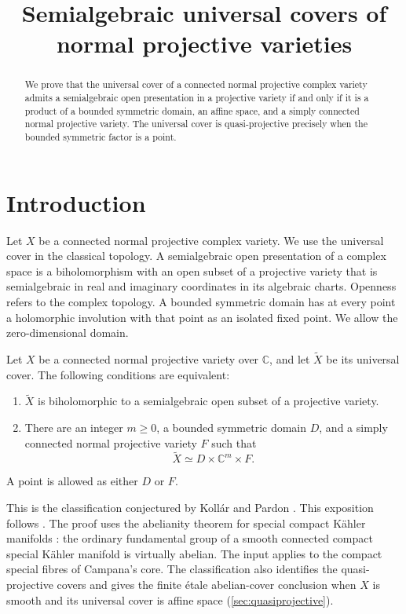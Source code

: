 \documentclass[11pt,a4paper]{amsart}
\title{Semialgebraic universal covers of normal projective varieties}
\author{}
\date{}
\begin{document}
\begin{abstract}
We prove that the universal cover of a connected normal projective complex variety admits a semialgebraic open presentation in a projective variety if and only if it is a product of a bounded symmetric domain, an affine space, and a simply connected normal projective variety. The universal cover is quasi-projective precisely when the bounded symmetric factor is a point.
\end{abstract}

\maketitle

\section{Introduction}\label{sec:introduction}

Let $X$ be a connected normal projective complex variety. We use the universal cover in the classical topology. A semialgebraic open presentation of a complex space is a biholomorphism with an open subset of a projective variety that is semialgebraic in real and imaginary coordinates in its algebraic charts. Openness refers to the complex topology. A bounded symmetric domain has at every point a holomorphic involution with that point as an isolated fixed point. We allow the zero-dimensional domain.

\begin{maintheorem}\label{thm:main}
Let $X$ be a connected normal projective variety over $\mathbb{C}$, and let $\widetilde X$ be its universal cover. The following conditions are equivalent:
\begin{enumerate}[label=\textup{(\roman*)}]
\item $\widetilde X$ is biholomorphic to a semialgebraic open subset
of a projective variety.
\item There are an integer $m\geq0$, a bounded symmetric domain $D$,
and a simply connected normal projective variety $F$ such that
\[
                 \widetilde X\simeq D\times\mathbb{C}^m\times F.
\]
\end{enumerate}
A point is allowed as either $D$ or $F$.
\end{maintheorem}

This is the classification conjectured by Koll\'ar and Pardon \cite[Conjecture~2]{KollarPardon2012}. This exposition follows \cite{OpenAIMathSource}. The proof uses the abelianity theorem for special compact K\"ahler manifolds \cite[Theorem~1.1]{SpecialAbelianity}: the ordinary fundamental group of a smooth connected compact special K\"ahler manifold is virtually abelian. The input applies to the compact special fibres of Campana's core. The classification also identifies the quasi-projective covers and gives the finite étale abelian-cover conclusion when $X$ is smooth and its universal cover is affine space (\cref{sec:quasiprojective}).
\end{document}
